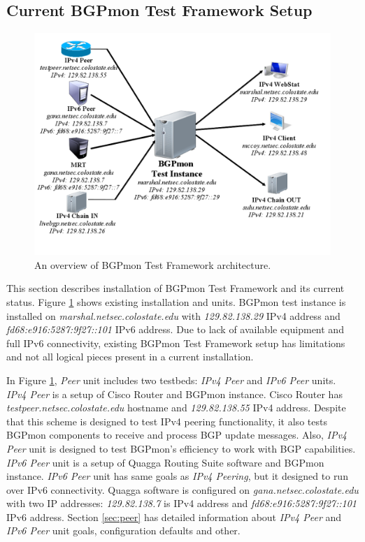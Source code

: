\subsection{Current BGPmon Test Framework Setup}

\begin{figure}
\centering
\includegraphics[scale=0.40]{figs/BGPmon-framework-current.png}
\caption{An overview of BGPmon Test Framework architecture.}
\label{currentfig}
\end{figure}

This section describes installation of BGPmon Test Framework and its current status.  Figure \ref{currentfig} shows existing installation and units. BGPmon test instance is installed on \emph{marshal.netsec.colostate.edu} with \emph{129.82.138.29} IPv4 address and \emph{fd68:e916:5287:9f27::101} IPv6 address.        Due to lack of   available equipment and full IPv6 connectivity, existing BGPmon Test Framework setup has limitations and not all logical pieces present in a current installation. 

In Figure \ref{currentfig}, \emph{Peer} unit includes two testbeds: \emph{IPv4 Peer} and \emph{IPv6 Peer} units. \emph{IPv4 Peer} is a setup of Cisco Router and BGPmon instance.  Cisco Router has  \emph{testpeer.netsec.colostate.edu} hostname and \emph{129.82.138.55} IPv4 address.  Despite that this scheme  is designed to test IPv4 peering functionality, it also tests BGPmon  components to receive and process  BGP update messages. Also, \emph{IPv4 Peer} unit is designed to test  BGPmon's efficiency to work with BGP capabilities. \emph{IPv6 Peer} unit is a setup of Quagga Routing Suite software and BGPmon instance. \emph{IPv6 Peer} unit has same goals as \emph{IPv4 Peering}, but it designed to run over IPv6 connectivity.  Quagga software is configured on \emph{gana.netsec.colostate.edu} with two IP addresses: \emph{129.82.138.7} is IPv4 address and \emph{fd68:e916:5287:9f27::101} IPv6 address.  Section \ref{sec:peer} has detailed information about \emph{IPv4 Peer} and \emph{IPv6 Peer} unit goals,  configuration defaults and other. 

